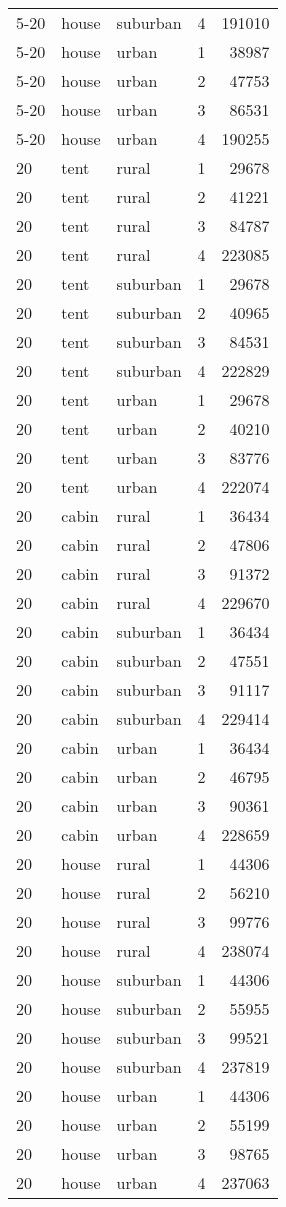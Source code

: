 \begin{center}
\begin{longtable}{llllr}
5-20 & house & suburban & 4 & 191010 \\
5-20 & house & urban & 1 & 38987 \\
5-20 & house & urban & 2 & 47753 \\
5-20 & house & urban & 3 & 86531 \\
5-20 & house & urban & 4 & 190255 \\
20 & tent & rural & 1 & 29678 \\
20 & tent & rural & 2 & 41221 \\
20 & tent & rural & 3 & 84787 \\
20 & tent & rural & 4 & 223085 \\
20 & tent & suburban & 1 & 29678 \\
20 & tent & suburban & 2 & 40965 \\
20 & tent & suburban & 3 & 84531 \\
20 & tent & suburban & 4 & 222829 \\
20 & tent & urban & 1 & 29678 \\
20 & tent & urban & 2 & 40210 \\
20 & tent & urban & 3 & 83776 \\
20 & tent & urban & 4 & 222074 \\
20 & cabin & rural & 1 & 36434 \\
20 & cabin & rural & 2 & 47806 \\
20 & cabin & rural & 3 & 91372 \\
20 & cabin & rural & 4 & 229670 \\
20 & cabin & suburban & 1 & 36434 \\
20 & cabin & suburban & 2 & 47551 \\
20 & cabin & suburban & 3 & 91117 \\
20 & cabin & suburban & 4 & 229414 \\
20 & cabin & urban & 1 & 36434 \\
20 & cabin & urban & 2 & 46795 \\
20 & cabin & urban & 3 & 90361 \\
20 & cabin & urban & 4 & 228659 \\
20 & house & rural & 1 & 44306 \\
20 & house & rural & 2 & 56210 \\
20 & house & rural & 3 & 99776 \\
20 & house & rural & 4 & 238074 \\
20 & house & suburban & 1 & 44306 \\
20 & house & suburban & 2 & 55955 \\
20 & house & suburban & 3 & 99521 \\
20 & house & suburban & 4 & 237819 \\
20 & house & urban & 1 & 44306 \\
20 & house & urban & 2 & 55199 \\
20 & house & urban & 3 & 98765 \\
20 & house & urban & 4 & 237063 \\
\end{longtable}
\end{center}
